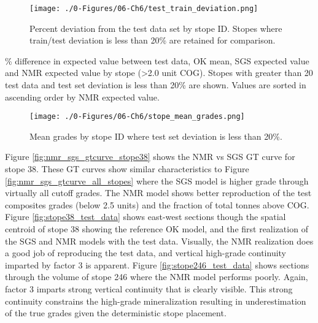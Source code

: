\begin{figure}[htb!]
    \centering
    \texttt{[image: ./0-Figures/06-Ch6/test\_train\_deviation.png]}
    \caption{Percent deviation from the test data set by stope ID. Stopes where train/test deviation is less than 20\% are retained for comparison. }
    \label{fig:test_train_deviation}
\end{figure}

\begin{table}[!htb]
    \centering
    \caption{\% difference in expected value between test data, \gls{OK} mean, \gls{SGS} expected value and \gls{NMR} expected value by stope (>2.0 unit \gls{COG}). Stopes with greater than 20 test data and test set deviation is less than 20\% are shown. Values are sorted in ascending order by \gls{NMR} expected value.}
    \resizebox{0.9\width}{!}{}
    \label{tab:nmr_sgs_stope_delta}
\end{table}

\begin{figure}[htb!]
    \centering
    \texttt{[image: ./0-Figures/06-Ch6/stope\_mean\_grades.png]}
    \caption{Mean grades by stope ID where test set deviation is less than 20\%. }
    \label{fig:stope_mean_grades}
\end{figure}

Figure \ref{fig:nmr_sgs_gtcurve_stope38} shows the \gls{NMR} vs \gls{SGS} \gls{GT} curve for stope 38. These \gls{GT} curves show similar characteristics to Figure \ref{fig:nmr_sgs_gtcurve_all_stopes} where the \gls{SGS} model is higher grade through virtually all cutoff grades. The \gls{NMR} model shows better reproduction of the test composites grades (below 2.5 units) and the fraction of total tonnes above \gls{COG}. Figure \ref{fig:stope38_test_data} shows east-west sections though the spatial centroid of stope 38 showing the reference \gls{OK} model, and the first realization of the \gls{SGS} and \gls{NMR} models with the test data. Visually, the \gls{NMR} realization does a good job of reproducing the test data, and vertical high-grade continuity imparted by factor 3 is apparent. Figure \ref{fig:stope246_test_data} shows sections through the volume of stope 246 where the \gls{NMR} model performs poorly. Again, factor 3 imparts strong vertical continuity that is clearly visible. This strong continuity constrains the high-grade mineralization resulting in underestimation of the true grades given the deterministic stope placement.

